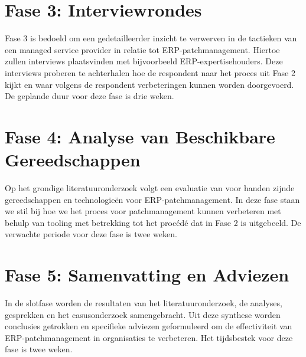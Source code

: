 \section{Fase 3: Interviewrondes}
Fase 3 is bedoeld om een gedetailleerder inzicht te verwerven in de tactieken van een managed service provider in relatie tot ERP-patchmanagement. Hiertoe zullen interviews plaatsvinden met bijvoorbeeld ERP-expertisehouders. Deze interviews proberen te achterhalen hoe de respondent naar het proces uit Fase 2 kijkt en waar volgens de respondent verbeteringen kunnen worden doorgevoerd. De geplande duur voor deze fase is drie weken.
\section{Fase 4: Analyse van Beschikbare Gereedschappen}
Op het grondige literatuuronderzoek volgt een evaluatie van voor handen zijnde gereedschappen en technologieën voor ERP-patchmanagement. In deze fase staan we stil bij hoe we het proces voor patchmanagement kunnen verbeteren met behulp van tooling met betrekking tot het procédé dat in Fase 2 is uitgebeeld. De verwachte periode voor deze fase is twee weken.
\section{Fase 5: Samenvatting en Adviezen}
In de slotfase worden de resultaten van het literatuuronderzoek, de analyses, gesprekken en het casusonderzoek samengebracht. Uit deze synthese worden conclusies getrokken en specifieke adviezen geformuleerd om de effectiviteit van ERP-patchmanagement in organisaties te verbeteren. Het tijdsbestek voor deze fase is twee weken. \